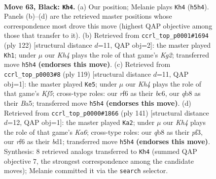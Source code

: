 \documentclass[11pt]{article}
\begin{document}
\clearpage

\begin{figure}[p]\centering
\begin{subfigure}{0.46\textwidth}\centering
\resizebox{\linewidth}{!}{%
\newchessgame
\chessboard[
  setfen={1Q6/P5B1/5R2/7k/3K4/8/8/8 b - - 0 63},
  showmover=false,
  pgfstyle=straightmove, color=movearrow, markmove={h5-h4}
]}
\caption{}
\end{subfigure}\hfill
\begin{subfigure}{0.46\textwidth}\centering
\resizebox{\linewidth}{!}{%
\newchessgame
\chessboard[
  setfen={4r3/5b2/7k/6p1/8/3Q4/6K1/8 w - - 6 62},
  showmover=false,
  pgfstyle=straightmove, color=movearrow, markmove={g2-h1}
]}
\caption{}
\end{subfigure}
\\[4pt]
\begin{subfigure}{0.46\textwidth}\centering
\resizebox{\linewidth}{!}{%
\newchessgame
\chessboard[
  setfen={8/8/2B3K1/b7/P4k2/7p/8/8 b - - 4 60},
  showmover=false,
  pgfstyle=straightmove, color=movearrow, markmove={f4-e5}
]}
\caption{}
\end{subfigure}\hfill
\begin{subfigure}{0.46\textwidth}\centering
\resizebox{\linewidth}{!}{%
\newchessgame
\chessboard[
  setfen={8/8/K7/8/5p2/k4P2/8/3Bb3 b - - 18 71},
  showmover=false,
  pgfstyle=straightmove, color=movearrow, markmove={a3-a2}
]}
\caption{}
\end{subfigure}
\caption{\textbf{Move 63, Black: \texttt{Kh4}.} (a) Our position; Melanie plays \texttt{Kh4} (\texttt{h5h4}). Panels (b)--(d) are the retrieved master positions whose correspondence most drove this move (highest QAP objective among those that transfer to it). (b) Retrieved from \texttt{ccrl\_top\_p0001\#1694} (ply 122) [structural distance $d$=11, QAP obj=2]: the master played \texttt{Kh1}; under $\mu$ our \emph{Kh4} plays the role of that game's \emph{Kg2}; transferred move \texttt{h5h4} \textbf{(endorses this move)}. (c) Retrieved from \texttt{ccrl\_top\_p0003\#8} (ply 119) [structural distance $d$=11, QAP obj=1]: the master played \texttt{Ke5}; under $\mu$ our \emph{Kh4} plays the role of that game's \emph{Kf5}; cross-type roles: our \emph{r}f6 as their \emph{b}c6, our \emph{q}b8 as their \emph{B}a5; transferred move \texttt{h5h4} \textbf{(endorses this move)}. (d) Retrieved from \texttt{ccrl\_top\_p0000\#1866} (ply 141) [structural distance $d$=12, QAP obj=1]: the master played \texttt{Ka2}; under $\mu$ our \emph{Kh4} plays the role of that game's \emph{Ka6}; cross-type roles: our \emph{q}b8 as their \emph{p}f3, our \emph{r}f6 as their \emph{b}d1; transferred move \texttt{h5h4} \textbf{(endorses this move)}. Synthesis: 8 retrieved analogs transferred to \texttt{Kh4} (summed QAP objective 7, the strongest correspondence among the candidate moves); Melanie committed it via the \texttt{search} selector.}
\label{fig:thought-m125}
\end{figure}
\end{document}
